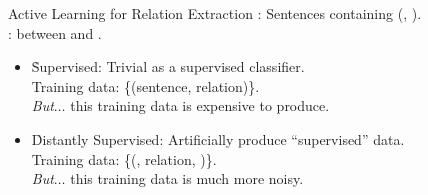 
%
%  


\begin{frame}{Active Learning for Relation Extraction}
  :  Sentences containing (, ). \\
  :  between  and .
  \pause
  \vspace{1cm}

   \begin{itemize}
    \item \h{Supervised:} Trivial as a supervised classifier. \\
      Training data: \{(sentence, relation)\}. \\
      \textit{But}$\dots$ \pause this training data is expensive to produce.
    \pause
    \vspace{0.5cm}
  
    \item \h{Distantly Supervised:} Artificially produce ``supervised'' data. \\
      Training data: \{(, relation, )\}. \\
      \textit{But}$\dots$ \pause this training data is much more noisy.
  \end{itemize}
\end{frame}

